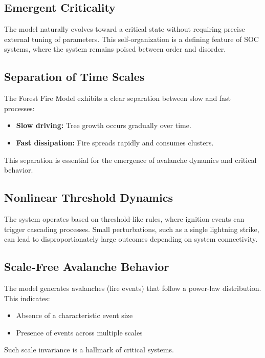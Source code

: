 \documentclass[12pt,a4paper]{article}
\begin{document}
\subsection{Emergent Criticality}

The model naturally evolves toward a critical state without requiring precise external tuning of parameters. This self-organization is a defining feature of SOC systems, where the system remains poised between order and disorder.

\subsection{Separation of Time Scales}

The Forest Fire Model exhibits a clear separation between slow and fast processes:
\begin{itemize}
\item \textbf{Slow driving:} Tree growth occurs gradually over time.
\item \textbf{Fast dissipation:} Fire spreads rapidly and consumes clusters.
\end{itemize}

This separation is essential for the emergence of avalanche dynamics and critical behavior.

\subsection{Nonlinear Threshold Dynamics}

The system operates based on threshold-like rules, where ignition events can trigger cascading processes. Small perturbations, such as a single lightning strike, can lead to disproportionately large outcomes depending on system connectivity.

\subsection{Scale-Free Avalanche Behavior}

The model generates avalanches (fire events) that follow a power-law distribution. This indicates:
\begin{itemize}
\item Absence of a characteristic event size
\item Presence of events across multiple scales
\end{itemize}

Such scale invariance is a hallmark of critical systems.
\end{document}
